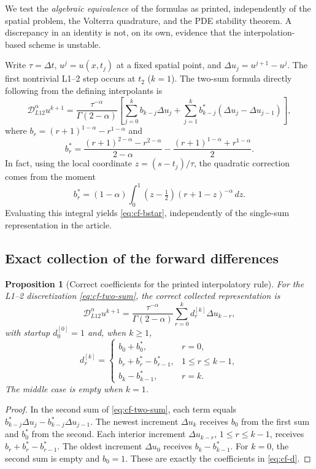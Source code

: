 \documentclass[11pt,a4paper]{amsart}
\theoremstyle{remark}
\theoremstyle{plain}
\newtheorem{proposition}{Proposition}[section]
\theoremstyle{remark}
\numberwithin{equation}{section}
\begin{document}
We test the \emph{algebraic equivalence} of the formulas as printed, independently of the spatial problem, the Volterra quadrature, and the PDE stability theorem. A discrepancy in an identity is not, on its own, evidence that the interpolation-based scheme is unstable.

Write $\tau=\Delta t$, $u^j=u(x,t_j)$ at a fixed spatial point, and $\Delta u_j=u^{j+1}-u^j$. The first nontrivial L1--2 step occurs at $t_2$ ($k=1$). The two-sum formula directly following from the defining interpolants is
\begin{equation}\label{eq:cf-two-sum}
\mathcal D_{L12}^\alpha u^{k+1}
=\frac{\tau^{-\alpha}}{\Gamma(2-\alpha)}
\left[\sum_{j=0}^k b_{k-j}\Delta u_j
+\sum_{j=1}^k b^*_{k-j}(\Delta u_j-\Delta u_{j-1})\right],
\end{equation}
where $b_r=(r+1)^{1-\alpha}-r^{1-\alpha}$ and
\begin{equation}\label{eq:cf-bstar}
 b_r^*=\frac{(r+1)^{2-\alpha}-r^{2-\alpha}}{2-\alpha}
 -\frac{(r+1)^{1-\alpha}+r^{1-\alpha}}2.
\end{equation}
In fact, using the local coordinate $z=(s-t_j)/\tau$, the quadratic correction comes from the moment
\[
 b_r^*=(1-\alpha)\int_0^1(z-\tfrac12)(r+1-z)^{-\alpha}\,dz.
\]
Evaluating this integral yields \eqref{eq:cf-bstar}, independently of the single-sum representation in the article.

\subsection{Exact collection of the forward differences}
\begin{proposition}[Correct coefficients for the printed interpolatory rule]
\label{prop:cf-collection}
For the L1--2 discretization \eqref{eq:cf-two-sum}, the correct collected representation is
\begin{equation}\label{eq:cf-collected}
\mathcal D_{L12}^\alpha u^{k+1}
=\frac{\tau^{-\alpha}}{\Gamma(2-\alpha)}
\sum_{r=0}^k d_r^{[k]}\Delta u_{k-r},
\end{equation}
with startup $d_0^{[0]}=1$ and, when $k\ge1$,
\begin{equation}\label{eq:cf-d}
 d_r^{[k]}=\begin{cases}
 b_0+b_0^*,&r=0,\\
 b_r+b_r^*-b_{r-1}^*,&1\le r\le k-1,\\
 b_k-b_{k-1}^*,&r=k.
 \end{cases}
\end{equation}
The middle case is empty when $k=1$.
\end{proposition}
\begin{proof}
In the second sum of \eqref{eq:cf-two-sum}, each term equals
$b_{k-j}^*\Delta u_j-b_{k-j}^*\Delta u_{j-1}$.
The newest increment $\Delta u_k$ receives $b_0$ from the first sum and $b_0^*$ from the second. Each interior increment $\Delta u_{k-r}$, $1\le r\le k-1$, receives $b_r+b_r^*-b_{r-1}^*$. The oldest increment $\Delta u_0$ receives $b_k-b_{k-1}^*$. For $k=0$, the second sum is empty and $b_0=1$. These are exactly the coefficients in \eqref{eq:cf-d}.
\end{proof}
\end{document}
